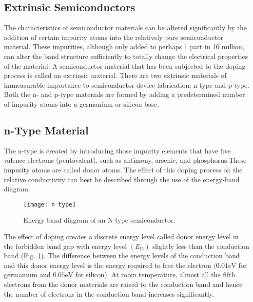 \subsection{Extrinsic Semiconductors}
The characteristics of semiconductor materials can be altered significantly by the addition of certain impurity atoms into the relatively pure semiconductor material. These impurities, although only added to perhaps 1 part in 10 million, can alter the band structure sufficiently to totally change the electrical properties of the material. A semiconductor material that has been subjected to the doping process is called an extrinsic material. There are two extrinsic materials of immeasurable importance to semiconductor device fabrication: n-type and p-type. Both the n- and p-type materials are formed by adding a predetermined number of impurity atoms into a germanium or silicon base.
\subsection{n-Type Material}
The n-type is created by introducing those impurity elements that have five valence electrons (pentavalent), such as antimony, arsenic, and phosphorus.These impurity atoms are called donor atoms. The effect of this doping process on the relative conductivity can best be described
through the use of the energy-band diagram.
\begin{figure}[H]
	\centering
	\texttt{[image: n type]}
	\caption{Energy band diagram of an N-type
		semiconductor.}
	\label{n type}
\end{figure}
The effect of doping creates a discrete energy level called donor energy level in the forbidden band gap with energy level $\left(E_{\mathrm{D}}\right)$ slightly less than the conduction band (Fig. \ref{n type}). The difference between the energy levels of the conduction band and this donor energy level is the energy required to free the electron $(0.01 \mathrm{eV}$ for germanium and $0.05 \mathrm{eV}$ for silicon). At room temperature, almost all the fifth electrons from the donor materials are raised to the conduction band and hence the number of electrons in the conduction band increases significantly.
